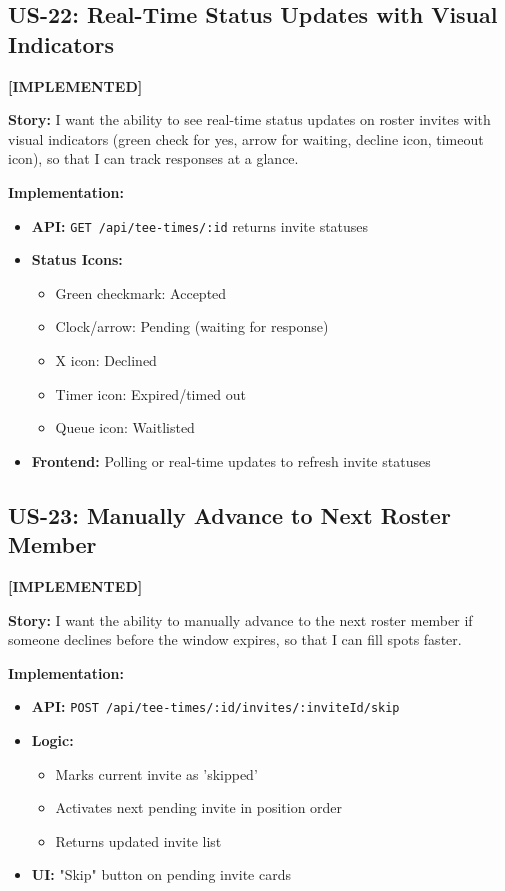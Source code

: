 \documentclass[11pt,a4paper]{article}
\newcommand{\implemented}{\textcolor{implemented}{\textbf{[IMPLEMENTED]}}}
\begin{document}
\subsection{US-22: Real-Time Status Updates with Visual Indicators}
\implemented

\textbf{Story:} I want the ability to see real-time status updates on roster invites with visual indicators (green check for yes, arrow for waiting, decline icon, timeout icon), so that I can track responses at a glance.

\textbf{Implementation:}
\begin{itemize}[leftmargin=*]
  \item \textbf{API:} \texttt{GET /api/tee-times/:id} returns invite statuses
  \item \textbf{Status Icons:}
    \begin{itemize}
      \item Green checkmark: Accepted
      \item Clock/arrow: Pending (waiting for response)
      \item X icon: Declined
      \item Timer icon: Expired/timed out
      \item Queue icon: Waitlisted
    \end{itemize}
  \item \textbf{Frontend:} Polling or real-time updates to refresh invite statuses
\end{itemize}

\subsection{US-23: Manually Advance to Next Roster Member}
\implemented

\textbf{Story:} I want the ability to manually advance to the next roster member if someone declines before the window expires, so that I can fill spots faster.

\textbf{Implementation:}
\begin{itemize}[leftmargin=*]
  \item \textbf{API:} \texttt{POST /api/tee-times/:id/invites/:inviteId/skip}
  \item \textbf{Logic:}
    \begin{itemize}
      \item Marks current invite as 'skipped'
      \item Activates next pending invite in position order
      \item Returns updated invite list
    \end{itemize}
  \item \textbf{UI:} "Skip" button on pending invite cards
\end{itemize}
\end{document}
